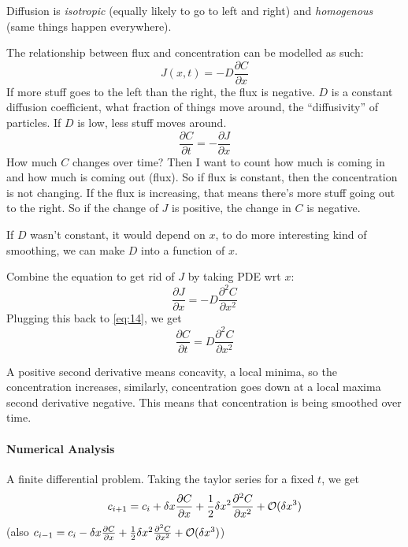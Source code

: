 Diffusion is \emph{isotropic} (equally likely to go to left and
right) and \emph{homogenous} (same things happen everywhere).

The relationship between flux and concentration can be modelled as
such:
\begin{equation}
  \label{eq:13}
  J(x,t) = -D \frac{\partial C}{\partial x}
\end{equation}
If more stuff goes to the left than the right, the flux is
negative. $D$ is a constant diffusion coefficient, what fraction of things move around, the ``diffusivity'' of
particles. If $D$ is low, less stuff moves around.
\begin{equation}
  \label{eq:14}
  \frac{\partial C}{\partial t} = - \frac{\partial J}{\partial x}
\end{equation}
How much $C$ changes over time? Then I want to count how much is
coming in and how much is coming out (flux).  So if flux is constant,
then the concentration is not changing. If the flux is increasing,
that means there's more stuff going out to the right. So if the change
of $J$ is positive, the change in $C$ is negative. 

If $D$ wasn't constant, it would depend on $x$, to do more interesting
kind of smoothing, we can make $D$ into a function of $x$.

Combine the equation to get rid of $J$ by taking PDE wrt $x$: $$  \frac{\partial J}{\partial x} = -D   \frac{\partial^2 C}{\partial
    x^2}$$
Plugging this back to \eqref{eq:14}, we get
\begin{equation}
  \label{eq:16}
  \frac{\partial C}{\partial t} = D \frac{\partial^2 C}{\partial
    x^2}
\end{equation}

A positive second derivative means concavity, a local minima, so the
concentration increases, similarly, concentration goes down at a local
maxima second derivative negative. This means that concentration is being
smoothed over time.

\paragraph{Numerical Analysis}
\label{sec:numerical-analysis}
A finite differential problem. Taking the taylor series for a fixed
$t$, we get
\begin{equation}
  \label{eq:17}
  c_{i+1} = c_i + \delta x   \frac{\partial C}{\partial x} +
  \frac{1}{2} \delta x^2   \frac{\partial^2 C}{\partial x^2} + \mathcal{O}(\delta x^3)
\end{equation}
(also $  c_{i-1} = c_i - \delta x   \frac{\partial C}{\partial x} +
  \frac{1}{2} \delta x^2   \frac{\partial^2 C}{\partial x^2} + \mathcal{O}(\delta
  x^3)$)

